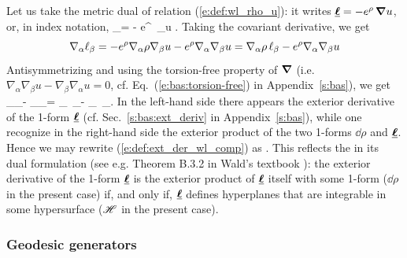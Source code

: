 Let us take the metric dual of relation (\ref{e:def:wl_rho_u}): it writes
$\underline{\bm{\ell}} = - e^\rho \, \bm{\nabla} u$, or, in index notation,
\be
    \el_\alpha = - e^\rho \, \nabla_\alpha u .
\ee
Taking the covariant derivative, we get
\[
    \nabla_\alpha \ell_\beta = - e^\rho \nabla_\alpha \rho \nabla_\beta u
                -   e^\rho  \nabla_\alpha \nabla_\beta u
                 = \nabla_\alpha \rho \, \ell_\beta - e^\rho  \nabla_\alpha \nabla_\beta u
\]
Antisymmetrizing and using the torsion-free property of $\bm{\nabla}$ (i.e.
$\nabla_\alpha \nabla_\beta u - \nabla_\beta \nabla_\alpha u = 0$, cf.
Eq.~(\ref{e:bas:torsion-free}) in Appendix~\ref{s:bas}), we get
\be \label{e:def:ext_der_wl_comp}
  \nabla_\alpha \el_\beta - \nabla_\beta \el_\alpha =
  \nabla_\alpha \rho \, \el_\beta -  \nabla_\beta \rho \, \el_\alpha  .
\ee
In the left-hand side there appears the exterior derivative of
the 1-form $\underline{\bm{\ell}}$ (cf. Sec.~\ref{s:bas:ext_deriv} in Appendix~\ref{s:bas}),
while one recognize in the right-hand side the exterior product of
the two 1-forms $\dd\rho$ and $\underline{\bm{\ell}}$. Hence we may rewrite (\ref{e:def:ext_der_wl_comp})
as
\be
    \encadre{ \dd \uu{\el} = \dd\rho \wedge \uu{\el} } .
\ee
This reflects the 
in its dual formulation (see e.g.
Theorem B.3.2 in Wald's textbook \cite{Wald84}): the exterior derivative of
the 1-form $\underline{\bm{\ell}}$ is the exterior product of $\underline{\bm{\ell}}$ itself with some
1-form ($\dd\rho$ in the present case) if, and only if,
$\underline{\bm{\ell}}$ defines hyperplanes that are integrable in some hypersurface ($\mathscr{H}$ in the present case).

\subsubsection{Geodesic generators} \label{s:def:geod_gener}

